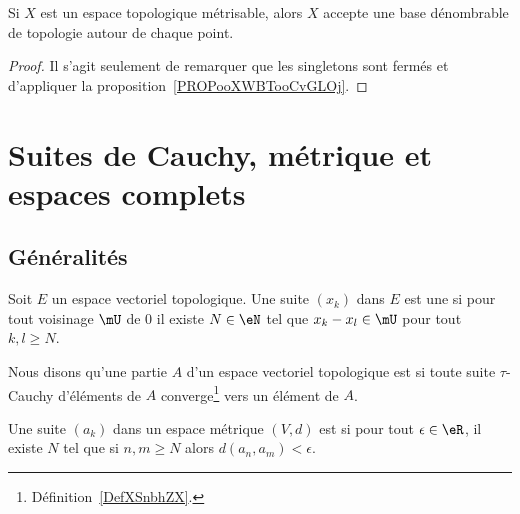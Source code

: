 \begin{corollary}       \label{CORooTWFYooCNMieM}
    Si \( X\) est un espace topologique métrisable, alors \( X\) accepte une base dénombrable de topologie autour de chaque point.
\end{corollary}

\begin{proof}
    Il s'agit seulement de remarquer que les singletons sont fermés et d'appliquer la proposition~\ref{PROPooXWBTooCvGLOj}.
\end{proof}

\section{Suites de Cauchy, métrique et espaces complets}

\subsection{Généralités}

\begin{definition}   \label{DefZSnlbPc}
    Soit \( E\) un espace vectoriel topologique. Une suite \( (x_k)\) dans \( E\) est une  si pour tout voisinage \( \mU\) de \( 0\) il existe \( N\in \eN\) tel que \( x_k-x_l\in\mU\) pour tout \( k,l\geq N\).
\end{definition}

\begin{definition}      \label{DEFooVQDBooNxprFU}
    Nous disons qu'une partie \( A\) d'un espace vectoriel topologique est  si toute suite \(  \tau\)-Cauchy d'éléments de \( A\) converge\footnote{Définition~\ref{DefXSnbhZX}.} vers un élément de \( A\).
\end{definition}

\begin{definition}      \label{DEFooXOYSooSPTRTn}
    Une suite \( (a_k)\) dans un espace métrique \( (V,d)\) est  si pour tout \( \epsilon\in \eR\), il existe \( N\) tel que si \( n,m\geq N\) alors \( d(a_n,a_m)<\epsilon\).
\end{definition}

